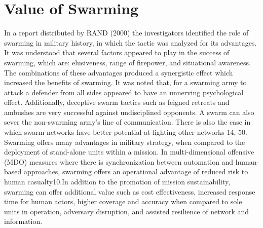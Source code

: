 \section*{Value of Swarming}
In a report distributed by RAND (2000) the investigators identified the role of swarming in military history, in which the tactic was analyzed for its advantages. It was understood that several factors appeared to play in the success of swarming, which are: elusiveness, range of firepower, and situational awareness. The combinations of these advantages produced a synergistic effect which increased the benefits of swarming. It was noted that, for a swarming army to attack a defender from all sides appeared to have an unnerving psychological effect. Additionally, deceptive swarm tactics such as feigned retreats and ambushes are very successful against undisciplined opponents. A swarm can also sever the non-swarming army’s line of communication. There is also the case in which swarm networks have better potential at fighting other networks 14, 50. Swarming offers many advantages in military strategy, when compared to the deployment of stand-alone units within a mission. In multi-dimensional offensive (MDO) measures where there is synchronization between automation and human-based approaches, swarming offers an operational advantage of reduced risk to human casualty10.In addition to the promotion of mission sustainability, swarming can offer additional value such as cost effectiveness, increased response time for human actors, higher coverage and accuracy when compared to sole units in operation, adversary disruption, and assisted resilience of network and information.
